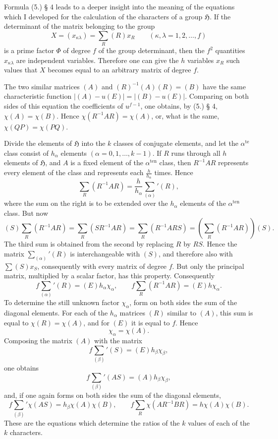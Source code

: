 \documentclass[11pt]{article}
\newcommand{\Hgrp}{\mathfrak{H}}
\newcommand{\ten}{\mathrm{ten}}
\newcommand{\te}{\mathrm{te}}
\begin{document}
Formula (5.) § 4 leads to a deeper insight into the meaning of the equations which I developed for the calculation of the characters of a group $\Hgrp$. If the determinant of the matrix belonging to the group
\[
X=(x_{\kappa\lambda})=\sum_R(R)x_R\qquad(\kappa,\lambda=1,2,\ldots,f)
\]
is a prime factor $\Phi$ of degree $f$ of the group determinant, then the $f^2$ quantities $x_{\kappa\lambda}$ are independent variables. Therefore one can give the $h$ variables $x_R$ such values that $X$ becomes equal to an arbitrary matrix of degree $f$.

The two similar matrices $(A)$ and $(R)^{-1}(A)(R)=(B)$ have the same characteristic function $|(A)-u(E)|=|(B)-u(E)|$. Comparing on both sides of this equation the coefficients of $u^{f-1}$, one obtains, by (5.) § 4, $\chi(A)=\chi(B)$. Hence $\chi(R^{-1}AR)=\chi(A)$, or, what is the same, $\chi(QP)=\chi(PQ)$.

Divide the elements of $\Hgrp$ into the $k$ classes of conjugate elements, and let the $\alpha^{\te}$ class consist of $h_\alpha$ elements $(\alpha=0,1,\ldots,k-1)$. If $R$ runs through all $h$ elements of $\Hgrp$, and $A$ is a fixed element of the $\alpha^{\ten}$ class, then $R^{-1}AR$ represents every element of the class and represents each $\frac{h}{h_\alpha}$ times. Hence
\[
\sum_R(R^{-1}AR)=\frac{h}{h_\alpha}\sum_{(\alpha)}'(R),
\]
where the sum on the right is to be extended over the $h_\alpha$ elements of the $\alpha^{\ten}$ class. But now
\[
(S)\sum_R(R^{-1}AR)=\sum_R(SR^{-1}AR)=\sum_R(R^{-1}ARS)=\left(\sum_R(R^{-1}AR)\right)(S).
\]
The third sum is obtained from the second by replacing $R$ by $RS$. Hence the matrix $\sum_{(\alpha)}'(R)$ is interchangeable with $(S)$, and therefore also with $\sum(S)x_S$, consequently with every matrix of degree $f$. But only the principal matrix, multiplied by a scalar factor, has this property. Consequently
\begin{equation}\tag{1.}
f\sum_{(\alpha)}'(R)=(E)h_\alpha\chi_\alpha,
\qquad
f\sum_R(R^{-1}AR)=(E)h\chi_\alpha.
\end{equation}
To determine the still unknown factor $\chi_\alpha$, form on both sides the sum of the diagonal elements. For each of the $h_\alpha$ matrices $(R)$ similar to $(A)$, this sum is equal to $\chi(R)=\chi(A)$, and for $(E)$ it is equal to $f$. Hence
\[
\chi_\alpha=\chi(A).
\]
Composing the matrix $(A)$ with the matrix
\[
f\sum_{(\beta)}'(S)=(E)h_\beta\chi_\beta,
\]
one obtains
\[
f\sum_{(\beta)}'(AS)=(A)h_\beta\chi_\beta,
\]
and, if one again forms on both sides the sum of the diagonal elements,
\begin{equation}\tag{2.}
f\sum_{(\beta)}'\chi(AS)=h_\beta\chi(A)\chi(B),
\qquad
f\sum_R\chi(AR^{-1}BR)=h\chi(A)\chi(B).
\end{equation}
These are the equations which determine the ratios of the $k$ values of each of the $k$ characters.
\end{document}
